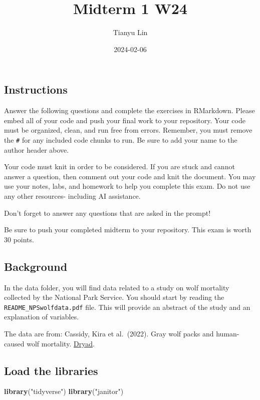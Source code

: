 \documentclass[
]{article}
\title{Midterm 1 W24}
\author{Tianyu Lin}
\date{2024-02-06}
\newenvironment{Shaded}{\begin{snugshade}}{\end{snugshade}}
\newcommand{\FunctionTok}[1]{\textcolor[rgb]{0.13,0.29,0.53}{\textbf{#1}}}
\newcommand{\NormalTok}[1]{#1}
\newcommand{\StringTok}[1]{\textcolor[rgb]{0.31,0.60,0.02}{#1}}
\begin{document}
\maketitle

\hypertarget{instructions}{%
\subsection{Instructions}\label{instructions}}

Answer the following questions and complete the exercises in RMarkdown.
Please embed all of your code and push your final work to your
repository. Your code must be organized, clean, and run free from
errors. Remember, you must remove the \texttt{\#} for any included code
chunks to run. Be sure to add your name to the author header above.

Your code must knit in order to be considered. If you are stuck and
cannot answer a question, then comment out your code and knit the
document. You may use your notes, labs, and homework to help you
complete this exam. Do not use any other resources- including AI
assistance.

Don't forget to answer any questions that are asked in the prompt!

Be sure to push your completed midterm to your repository. This exam is
worth 30 points.

\hypertarget{background}{%
\subsection{Background}\label{background}}

In the data folder, you will find data related to a study on wolf
mortality collected by the National Park Service. You should start by
reading the \texttt{README\_NPSwolfdata.pdf} file. This will provide an
abstract of the study and an explanation of variables.

The data are from: Cassidy, Kira et al.~(2022). Gray wolf packs and
human-caused wolf mortality.
\href{https://doi.org/10.5061/dryad.mkkwh713f}{Dryad}.

\hypertarget{load-the-libraries}{%
\subsection{Load the libraries}\label{load-the-libraries}}

\begin{Shaded}
\begin{Highlighting}[]
\FunctionTok{library}\NormalTok{(}\StringTok{"tidyverse"}\NormalTok{)}
\FunctionTok{library}\NormalTok{(}\StringTok{"janitor"}\NormalTok{)}
\end{Highlighting}
\end{Shaded}
\end{document}
